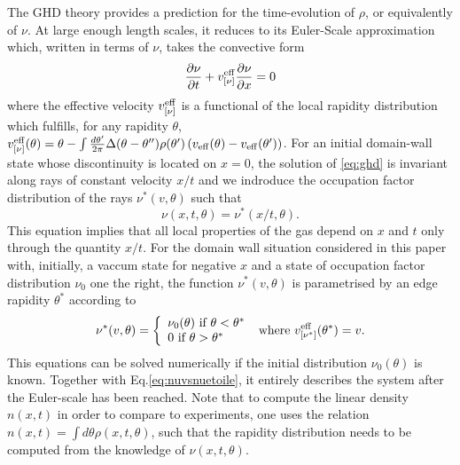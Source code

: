 \documentclass[submission, Phys]{SciPost}
\begin{document}
The GHD theory provides a prediction for
the time-evolution of $\rho$, or equivalently of $\nu$. At large enough length scales, it reduces to its Euler-Scale approximation which, written in terms of $\nu$, takes the convective form 
\begin{equation}
\frac{\partial\nu}{\partial t} + v^{\rm{eff}}_{[\nu]}\frac{\partial  \nu }{\partial x} = 0
\end{equation}
where the effective velocity $v^{\rm{eff}}_{[\nu]}$ is a functional of the local rapidity distribution which fulfills, for any rapidity $\theta$,
$v_{[\nu]}^{\rm{eff}}(\theta) = \theta -\int \frac{d\theta'}{2\pi} \Delta(\theta-\theta'') \rho(\theta')\left (  v_{\rm{eff}}(\theta) - v_{\rm{eff}}(\theta') \right )$.
For an initial domain-wall state whose discontinuity is located on $x=0$, the solution of \eqref{eq:ghd} is invariant along rays of constant velocity $x/t$ and we indroduce the occupation factor distribution of the rays $\nu^*(v,\theta)$ such that 
\begin{equation}
\label{eq:nuvsnuetoile}
    \nu(x,t,\theta)=\nu^*( x/t,\theta).
\end{equation} 
This equation implies that all local properties of the gas depend on $x$ and $t$ only through the quantity $x/t$. 
For the domain wall situation considered in this paper with, initially, a  vaccum state for negative $x$ and 
a state of occupation factor distribution $\nu_0$ one the right, 
 the function $\nu^*(v,\theta)$ is parametrised by an edge rapidity $\theta^*$ according to
\begin{equation}
\label{eq:nuetoile}
    \nu^*(v,\theta)=\left \{ \begin{array}{l} 
    \nu_0(\theta) \mbox{ if } \theta < \theta^*\\
    0 \mbox{ if } \theta > \theta^*\\
    \end{array} \right . \mbox{ where  }  v^{\rm{eff}}_{[\nu^*]}(\theta^*)=v.
\end{equation}
This equations can be solved numerically 
if the initial distribution $\nu_0(\theta)$ is known. Together with Eq.\eqref{eq:nuvsnuetoile}, it entirely describes the system after the Euler-scale has been 
reached. Note that to compute the linear density $n(x,t)$ in order to compare to experiments,  one
uses the relation $n(x,t)=\int d\theta \rho(x,t,\theta)$, such that the rapidity distribution
needs to be computed from the knowledge of $\nu(x,t,\theta)$.
\end{document}
